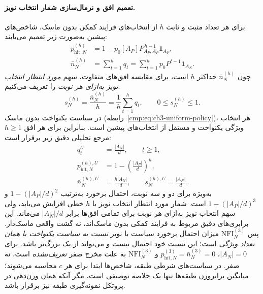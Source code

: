 \paragraph{تعمیم افق و نرمال‌سازی شمار انتخاب نویز.}
برای هر تعداد مثبت و ثابت $h$ از انتخاب‌های
فرایند کمکی بدون ماسک، شاخص‌های پیشین
به‌صورت زیر تعمیم می‌یابند:
\begin{equation}\label{cmp:eq:ch3-noise-general-horizon}
\boxed{
\begin{aligned}
p_{\mathrm{hit},N}^{(h)}
&=1-p_0[A_P]P_{A_P,A_P}^{\,h-1}\mathbf 1_{A_P},\\
\bar n_N^{(h)}
&=\sum_{t=1}^{h}q_t
=\sum_{t=1}^{h}p_0P^{t-1}\mathbf 1_{A_N}.
\end{aligned}}
\end{equation}
چون $\bar n_N^{(h)}$ حداکثر $h$ است،
برای مقایسه افق‌های متفاوت، سهم
\emph{مورد انتظار انتخاب نویز به‌ازای هر نوبت}
را تعریف می‌کنیم:
\begin{equation}\label{cmp:eq:ch3-noise-normalized-expectation}
\boxed{
s_N^{(h)}=\frac{\bar n_N^{(h)}}{h}
=\frac1h\sum_{t=1}^{h}q_t,\qquad
0\le s_N^{(h)}\le1.
}
\end{equation}
در سیاست یکنواخت بدون ماسک
(رابطه~\eqref{cmp:eq:ch3-uniform-policy})،
هر انتخاب ویژگی یکنواخت و
مستقل از انتخاب‌های پیشین است.
بنابراین برای هر افق $h\ge1$
مرجع تحلیلی دقیق زیر برقرار است:
\begin{equation}\label{cmp:eq:ch3-noise-uniform-reference}
\boxed{
\begin{aligned}
q_t^U&=\frac{|A_N|}{d},\qquad t\ge1,\\
p_{\mathrm{hit},N}^{(h),U}
&=1-\left(\frac{|A_P|}{d}\right)^h,\\
\bar n_N^{(h),U}&=\frac{h|A_N|}{d},
\qquad s_N^{(h),U}=\frac{|A_N|}{d}.
\end{aligned}}
\end{equation}
به‌ویژه برای دو و سه نوبت،
احتمال برخورد به‌ترتیب
$1-(|A_P|/d)^2$
و $1-(|A_P|/d)^3$ است.
شمار مورد انتظار انتخاب نویز
با $h$ خطی افزایش می‌یابد،
ولی سهم انتخاب نویز به‌ازای
هر نوبت برای تمامی افق‌ها
برابر $|A_N|/d$ می‌ماند.
این برابری‌های دقیق مربوط
به فرایند کمکی بدون ماسک‌اند،
نه گشت واقعی ماسک‌دار.
پس $\mathrm{NFI}_N^{(3)}$ میزان احتمال برخورد سیاست با نویز
\emph{نسبت به سیاست یکنواخت با همان تعداد ویژگی} است؛
این نسبت خود احتمال نیست و می‌تواند از یک بزرگ‌تر باشد.
برای $|A_N|=0$، $p_{\mathrm{hit},N}^{(3)}
=\bar n_N^{(3)}=0$ و $\mathrm{NFI}_N^{(3)}$ به علت مخرج
صفر \emph{تعریف‌نشده} است، نه صفر.
در سیاست‌های شرطی طبقه، شاخص‌ها ابتدا برای هر
$c$ محاسبه می‌شوند؛ میانگین برابر‌وزن طبقه‌ها
تنها یک خلاصه توصیفی است، مگر آنکه همان وزن‌دهی
در پروتکل نمونه‌گیری طبقه نیز برقرار باشد.

